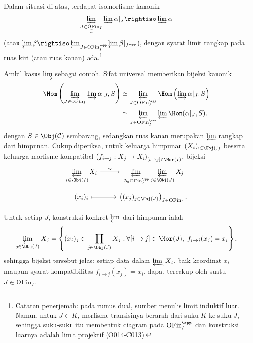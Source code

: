 \begin{proposisi}\label{prop:limit-filtered-approx}
	Dalam situasi di atas, terdapat isomorfisme kanonik
	\[ \varinjlim_{\substack{J \in \mathrm{OFin}_I \\ \subset}} \varinjlim \alpha|_J \rightiso \varinjlim \alpha \]
	(atau $\varprojlim \beta \rightiso
	\varprojlim_{J \in \mathrm{OFin}_I^{\opp}}
	\varprojlim \beta|_{J^{\opp}}$), dengan syarat limit rangkap pada ruas kiri
	(atau ruas kanan) ada.\footnote{Catatan penerjemah: pada rumus dual, sumber
	menulis limit induktif luar. Namun untuk $J\subset K$, morfisme transisinya
	berarah dari suku $K$ ke suku $J$, sehingga suku-suku itu membentuk diagram
	pada $\mathrm{OFin}_I^{\opp}$ dan konstruksi luarnya adalah limit projektif
	(O014-C013).}
\end{proposisi}
\begin{bukti}
	Ambil kasus $\varinjlim$ sebagai contoh. Sifat universal memberikan bijeksi
	kanonik
	\[ \begin{aligned}
	\Hom\left( \varinjlim_{J\in\mathrm{OFin}_I} \varinjlim \alpha|_J, S \right)
	&\simeq \varprojlim_{J\in\mathrm{OFin}_I^{\opp}}
	\Hom\left( \varinjlim \alpha|_J, S \right) \\
	&\simeq \varprojlim_{J\in\mathrm{OFin}_I^{\opp}}
	\varprojlim \Hom(\alpha|_J, S) .
	\end{aligned} \]
	dengan $S \in \Obj(\mathcal{C})$ sembarang, sedangkan ruas kanan merupakan
	$\varprojlim$ rangkap dari himpunan. Cukup diperiksa, untuk keluarga
	himpunan $(X_i)_{i \in \Obj(I)}$ beserta keluarga
	morfisme kompatibel
	$\left( f_{i \to j}: X_j \to X_i \right)_{[i \to j] \in \Mor(I)}$,
	bijeksi
	\[\begin{tikzcd}[row sep=tiny]
		\displaystyle\varprojlim_{i \in \Obj(I)} X_i \arrow[r, "\sim"] & \displaystyle\varprojlim_{J \in \mathrm{OFin}_I^{\opp}} \displaystyle\varprojlim_{j \in \Obj(J)} X_j \\
		(x_i)_i \arrow[mapsto, r] & \left( (x_j)_{j \in \Obj(J)} \right)_{J \in \mathrm{OFin}_I} .
	\end{tikzcd}\]

	Untuk setiap $J$, konstruksi konkret $\varprojlim$ dari himpunan ialah
	\[ \varprojlim_{j \in \Obj(J)} X_j = \left\{ (x_j)_j \in \prod_{j \in \Obj(J)} X_j : \forall [i \to j] \in \Mor(J), \; f_{i \to j}(x_j) = x_i \right\}, \]
	sehingga bijeksi tersebut jelas: setiap data dalam $\varprojlim_i X_i$,
	baik koordinat $x_i$ maupun syarat kompatibilitas
	$f_{i \to j}(x_j) = x_i$, dapat tercakup oleh suatu
	$J \in \mathrm{OFin}_I$.
\end{bukti}

